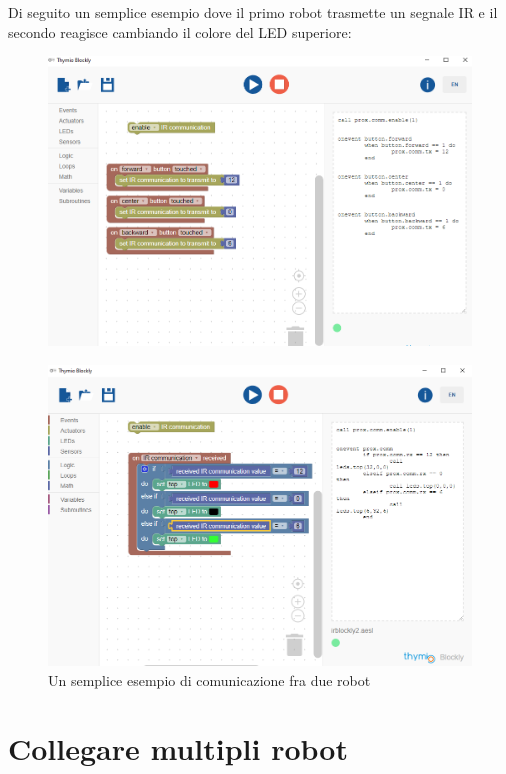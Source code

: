 \documentclass[12pt]{article}
\begin{document}
	Di seguito un semplice esempio dove il primo robot trasmette un segnale IR e il secondo reagisce cambiando il colore del LED superiore: 
	
	\begin{figure}[H]
		\includegraphics[width=\textwidth]{img/blocklyIR1.png}
		\label{blocklyIR1}
	\end{figure}
		
	\begin{figure}[H]
		\includegraphics[width=\textwidth]{img/blocklyIR2.png}
		\caption{Un semplice esempio di comunicazione fra due robot}
		\label{blocklyIR2}
	\end{figure}
	
	
\section{Collegare multipli robot}\label{multi-robot}
\end{document}
